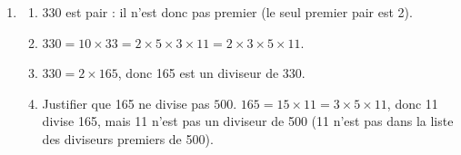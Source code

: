 
\medskip

\begin{enumerate}
\item 
	\begin{enumerate}
		\item %
		330 est pair : il n'est donc pas premier (le seul premier pair est 2).
		
		\item %
$330 = 10 \times 33 = 2 \times 5 \times 3 \times 11 = 2 \times 3 \times 5 \times 11$.
		\item %
$330 = 2 \times 165$, donc 165 est un diviseur de 330.
		\item Justifier que 165 ne divise pas $500$.
$165 = 15 \times 11 = 3 \times 5 \times 11$, donc 11 divise 165, mais 11 n'est pas un diviseur de 500 (11 n'est pas dans la liste des diviseurs premiers de 500).
	\end{enumerate}
\end{enumerate}
	




